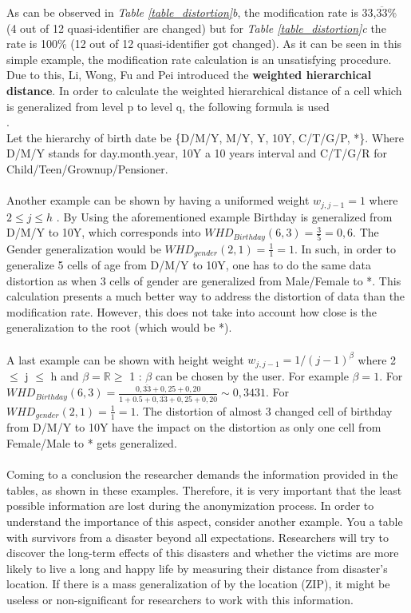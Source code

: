 \documentclass{llncs}
\newcommand{\R}{\mathbb{R}}
\begin{document}
As can be observed in \textit{Table \ref{table_distortion}b}, the modification rate is  33,$\overline{33}$\% (4 out of 12 quasi-identifier are changed) but for \textit{Table \ref{table_distortion}c} the rate is 100\% (12 out of 12 quasi-identifier got changed). As it can be seen in this simple example, the modification rate calculation is an unsatisfying procedure. Due to this, Li, Wong, Fu and Pei introduced the \textbf{weighted hierarchical distance}. In order to calculate the weighted hierarchical distance of a cell which is generalized from level p to level q, the following formula is used\\
\cite{li2006achieving}.\\
Let the hierarchy of birth date be \{D/M/Y, M/Y, Y, 10Y, C/T/G/P, *\}. Where D/M/Y  stands for day.month.year, 10Y a 10 years interval and C/T/G/R for Child/Teen/Grownup/Pensioner.
\\\\
Another example can be shown by having a uniformed weight $w_{j,j-1} = 1$ where $2\leq j \leq h$ \cite{li2006achieving}. By Using the aforementioned example Birthday is generalized from D/M/Y to 10Y, which corresponds into $WHD_{Birthday}(6,3) = \frac{3}{5} = 0,6$. 
The Gender generalization would be $WHD_{gender}(2,1) = \frac{1}{1} = 1$. In such, in order to generalize 5 cells of age from D/M/Y to 10Y, one has to do the same data distortion as when 3 cells of gender are generalized from Male/Female to *. This calculation presents a much better way to address the distortion of data than the modification rate. However, this does not take into account how close is the generalization to the root (which would be *).\\\\
A last example can be shown with height weight $w_{j,j-1} = 1 / (j-1)^{\beta}$ where 2 $\leq$ j $\leq$ h and $\beta = \R \geq$ 1 \cite{li2006achieving}:
$\beta$ can be chosen by the user. For example $\beta = 1$. For $WHD_{Birthday}(6,3) = \frac{0,\overline{33}+0,25+0,20}{1+0.5+0,\overline{33}+0,25+0,20} \sim 0,3431$. For $WHD_{gender}(2,1) = \frac{1}{1} = 1$. The distortion of almost 3 changed cell of birthday from D/M/Y to 10Y have the impact on the distortion as only one cell from Female/Male to * gets generalized.\\\\
Coming to a conclusion the researcher demands the information provided in the tables, as shown in these examples. Therefore, it is very important that the least possible information are lost during the anonymization process. In order to understand the importance of this aspect, consider another example. You a table with survivors from a disaster beyond all expectations. Researchers will try to discover the long-term effects of this disasters and whether the victims are more likely to live a long and happy life by measuring their distance from disaster’s location. If there is a mass generalization of by the location (ZIP), it might be useless or non-significant for researchers to work with this information.
\end{document}
